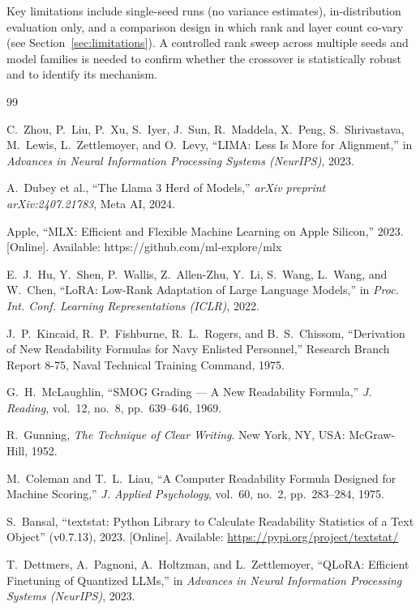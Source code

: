 \documentclass[journal]{IEEEtai}
\begin{document}
Key limitations include single-seed runs (no variance estimates), in-distribution evaluation only, and a comparison design in which rank and layer count co-vary (see Section~\ref{sec:limitations}). A controlled rank sweep across multiple seeds and model families is needed to confirm whether the crossover is statistically robust and to identify its mechanism.

\begin{thebibliography}{99}

C.~Zhou, P.~Liu, P.~Xu, S.~Iyer, J.~Sun, R.~Maddela, X.~Peng, S.~Shrivastava, M.~Lewis, L.~Zettlemoyer, and O.~Levy, ``LIMA: Less Is More for Alignment,'' in \textit{Advances in Neural Information Processing Systems (NeurIPS)}, 2023.

A.~Dubey et al., ``The Llama 3 Herd of Models,'' \textit{arXiv preprint arXiv:2407.21783}, Meta AI, 2024.

Apple, ``MLX: Efficient and Flexible Machine Learning on Apple Silicon,'' 2023. [Online]. Available: https://github.com/ml-explore/mlx

E.~J.~Hu, Y.~Shen, P.~Wallis, Z.~Allen-Zhu, Y.~Li, S.~Wang, L.~Wang, and W.~Chen, ``LoRA: Low-Rank Adaptation of Large Language Models,'' in \textit{Proc. Int. Conf. Learning Representations (ICLR)}, 2022.

J.~P.~Kincaid, R.~P.~Fishburne, R.~L.~Rogers, and B.~S.~Chissom, ``Derivation of New Readability Formulas for Navy Enlisted Personnel,'' Research Branch Report 8-75, Naval Technical Training Command, 1975.

G.~H.~McLaughlin, ``SMOG Grading --- A New Readability Formula,'' \textit{J. Reading}, vol.~12, no.~8, pp.~639--646, 1969.

R.~Gunning, \textit{The Technique of Clear Writing}. New York, NY, USA: McGraw-Hill, 1952.

M.~Coleman and T.~L.~Liau, ``A Computer Readability Formula Designed for Machine Scoring,'' \textit{J. Applied Psychology}, vol.~60, no.~2, pp.~283--284, 1975.

S.~Bansal, ``textstat: Python Library to Calculate Readability Statistics of a Text Object'' (v0.7.13), 2023. [Online]. Available: \url{https://pypi.org/project/textstat/}

T.~Dettmers, A.~Pagnoni, A.~Holtzman, and L.~Zettlemoyer, ``QLoRA: Efficient Finetuning of Quantized LLMs,'' in \textit{Advances in Neural Information Processing Systems (NeurIPS)}, 2023.


\end{thebibliography}
\end{document}
